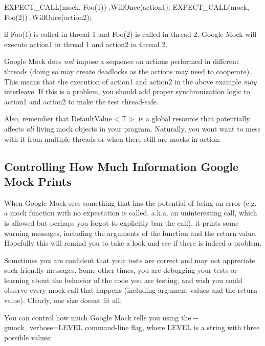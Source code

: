 \begin{DoxyCode}
EXPECT\_CALL(mock, Foo(1))
    .WillOnce(action1);
EXPECT\_CALL(mock, Foo(2))
    .WillOnce(action2);
\end{DoxyCode}


if {\ttfamily Foo(1)} is called in thread 1 and {\ttfamily Foo(2)} is called in thread 2, Google Mock will execute {\ttfamily action1} in thread 1 and {\ttfamily action2} in thread 2.

Google Mock does {\itshape not} impose a sequence on actions performed in different threads (doing so may create deadlocks as the actions may need to cooperate). This means that the execution of {\ttfamily action1} and {\ttfamily action2} in the above example {\itshape may} interleave. If this is a problem, you should add proper synchronization logic to {\ttfamily action1} and {\ttfamily action2} to make the test thread-\/safe.

Also, remember that {\ttfamily Default\+Value$<$T$>$} is a global resource that potentially affects {\itshape all} living mock objects in your program. Naturally, you won\textquotesingle{}t want to mess with it from multiple threads or when there still are mocks in action.

\subsection*{Controlling How Much Information Google Mock Prints}

When Google Mock sees something that has the potential of being an error (e.\+g. a mock function with no expectation is called, a.\+k.\+a. an uninteresting call, which is allowed but perhaps you forgot to explicitly ban the call), it prints some warning messages, including the arguments of the function and the return value. Hopefully this will remind you to take a look and see if there is indeed a problem.

Sometimes you are confident that your tests are correct and may not appreciate such friendly messages. Some other times, you are debugging your tests or learning about the behavior of the code you are testing, and wish you could observe every mock call that happens (including argument values and the return value). Clearly, one size doesn\textquotesingle{}t fit all.

You can control how much Google Mock tells you using the {\ttfamily -\/-\/gmock\+\_\+verbose=L\+E\+V\+EL} command-\/line flag, where {\ttfamily L\+E\+V\+EL} is a string with three possible values\+:


